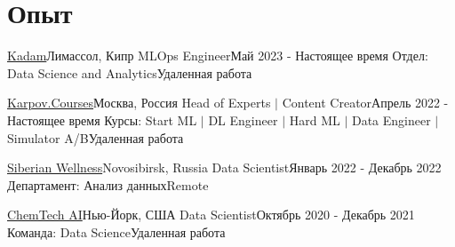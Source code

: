 \section{Опыт}
\resumeSubHeadingListStart

\resumeSubheadingWork
{\href{https://www.kadam.net/}{Kadam}}{Лимассол, Кипр}
{MLOps Engineer}{Май 2023 - Настоящее время}
{Отдел: Data Science and Analytics}{Удаленная работа}
\resumeItemListStart
{}
\resumeItemListEnd

\resumeSubheadingWork
{\href{https://www.karpov.courses/}{Karpov.Courses}}{Москва, Россия}
{Head of Experts $|$ Content Creator}{Апрель 2022 - Настоящее время}
{Курсы: Start ML $|$ DL Engineer $|$ Hard ML $|$ Data Engineer $|$ Simulator A/B}{Удаленная работа}
\resumeItemListStart
{}
\resumeItemListEnd

\resumeSubheadingWork
{\href{https://siberianhealth.com/ru}{Siberian Wellness}}{Novosibirsk, Russia}
{Data Scientist}{Январь 2022 - Декабрь 2022}
{Департамент: Анализ данных}{Remote}
\resumeItemListStart
{}
\resumeItemListEnd

\resumeSubheadingWork
{\href{https://www.chmtch.com/}{ChemTech AI}}{Нью-Йорк, США}
{Data Scientist}{Октябрь 2020 - Декабрь 2021}
{Команда: Data Science}{Удаленная работа}
\resumeItemListStart
{}
\resumeItemListEnd

\resumeSubHeadingListEnd
